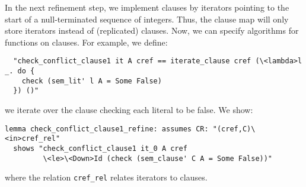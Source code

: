 \documentclass{llncs}
\newcommand{\isai}{\lstinline[language=isabelle,basicstyle=\normalsize\ttfamily\slshape]}
\begin{document}
In the next refinement step, we implement clauses by iterators pointing to the start of a null-terminated sequence of integers.
Thus, the clause map will only store iterators instead of (replicated) clauses. 
Now, we can specify algorithms for functions on clauses. For example, we define:
\begin{lstlisting}
  "check_conflict_clause1 it A cref == iterate_clause cref (\<lambda>l _. do {
    check (sem_lit' l A = Some False)
  }) ()"
\end{lstlisting}
\ie we iterate over the clause checking each literal to be false. We show:
\begin{lstlisting}
lemma check_conflict_clause1_refine: assumes CR: "(cref,C)\<in>cref_rel"
  shows "check_conflict_clause1 it_0 A cref 
         \<le>\<Down>Id (check (sem_clause' C A = Some False))"
\end{lstlisting}
where the relation \isai{cref_rel} relates iterators to clauses.
\end{document}
